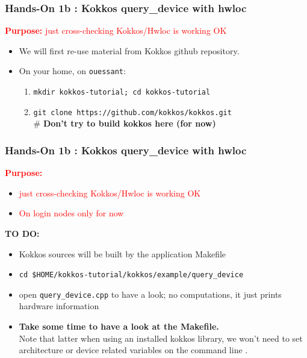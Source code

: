 \begin{frame}
  \frametitle{Hands-On 1b : Kokkos query\_device with hwloc}

  {\large\textcolor{red}{\textbf{Purpose:} just cross-checking Kokkos/Hwloc is working OK}}

  \begin{itemize}
  \item We will first re-use material from Kokkos github repository.
  \item On your home, on \texttt{ouessant}: 
    \begin{enumerate}
    \item \texttt{mkdir kokkos-tutorial; cd kokkos-tutorial}
    \item \texttt{git clone https://github.com/kokkos/kokkos.git} \\
      \# \textbf{Don't try to build kokkos here (for now)}
    \end{enumerate}
  \end{itemize}

\end{frame}

\begin{frame}[fragile=singleslide]
  \frametitle{Hands-On 1b : Kokkos query\_device with hwloc}

  {\large\textcolor{red}{\textbf{Purpose:}}}
  \begin{itemize}
  \item \textcolor{red}{just cross-checking Kokkos/Hwloc is working OK}
  \item \textcolor{red}{On login nodes only for now}
  \end{itemize}
    
  {\bf TO DO:}
  \begin{itemize}
  \item Kokkos sources will be built by the application Makefile
  \item \texttt{cd \$HOME/kokkos-tutorial/kokkos/example/query\_device}
  \item open \texttt{query\_device.cpp} to have a look; no computations, it just prints hardware information
  \item \textbf{Take some time to have a look at the Makefile.}\\
    Note that latter when using an installed kokkos library, we won't need to set architecture or device related variables on the command line .
  \end{itemize}

\end{frame}

